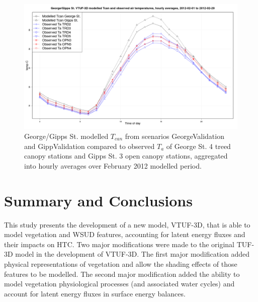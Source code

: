 \documentclass[final,3p,times,authoryear]{elsarticle}
\begin{document}
\begin{figure}[!htbp]
\includegraphics[trim = 0mm 0mm 0mm 0mm, clip, scale=0.30]{images/GeorgeValidationTcanAgg.png}
\caption{George/Gipps St. modelled $T_{can}$ from scenarios GeorgeValidation and GippValidation compared to observed $T_{a}$ of George St. 4 treed canopy stations and Gipps St. 3 open canopy stations, aggregated into hourly averages over February 2012 modelled period.\label{fig:GeorgeGippsStTcanCompare}} 
\end{figure}


\section{Summary and Conclusions}

This study presents the development of a new model, VTUF-3D, that is able to model vegetation and WSUD features, accounting for latent energy fluxes and their impacts on HTC. Two major modifications were made to the original TUF-3D model in the development of VTUF-3D. The first major modification added physical representations of vegetation and allow the shading effects of those features to be modelled. The second major modification added the ability to model vegetation physiological processes (and associated water cycles) and account for latent energy fluxes in surface energy balances.
\end{document}
